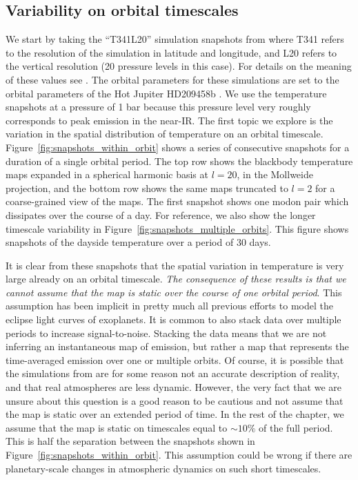 \documentclass[12pt,dvipsnames]{report}
\begin{document}
\subsection{Variability on orbital timescales}
We start by taking the ``T341L20'' simulation snapshots from \citet{2021ApJ...913L..32C} 
where T341 refers to the resolution of the simulation in latitude and longitude, and 
L20 refers to the vertical resolution (20 pressure levels in this case). 
For details on the meaning of these values see \citet{2021MNRAS.504.5172S}. 
The orbital parameters for these simulations are set to the orbital parameters of the
Hot Jupiter HD209458b  \citep{2000ApJ...529L..41H,2000ApJ...529L..45C}. 
We use the temperature snapshots at a pressure of 1 bar because this pressure level very roughly 
corresponds to peak emission in the near-IR.
The first topic we explore is the variation in the spatial distribution of 
temperature on an orbital timescale. Figure~\ref{fig:snapshots_within_orbit} shows a series 
of consecutive snapshots for a duration of a single orbital period.
The top row shows the blackbody temperature maps expanded in a spherical harmonic basis 
at $l=20$, in the Mollweide projection, and the bottom row shows the same maps truncated 
to $l=2$ for a coarse-grained view of the maps. The first snapshot shows one modon pair
which dissipates over the course of a day. For reference, we also show the longer timescale
variability in Figure~\ref{fig:snapshots_multiple_orbits}. This figure shows snapshots 
of the dayside temperature over a period of 30 days. 


It is clear from these snapshots that the spatial variation in temperature is very large 
already on an orbital timescale. \emph{The consequence of these results is that we 
cannot assume that the map is static over the course of one orbital period}. This assumption
has been implicit in pretty much all previous efforts to model the eclipse light curves
of exoplanets. It is common to also stack data over multiple periods to increase 
signal-to-noise. Stacking the data means that we are not inferring 
an instantaneous map of emission, but rather a map that represents the time-averaged emission over 
one or multiple orbits. Of course, it is possible that the simulations from 
\citet{2021ApJ...913L..32C} are for some reason not an accurate description of reality,
and that real atmospheres are less dynamic. However, the very fact that we are unsure 
about this question is a good reason to be cautious and not assume that the map is static over an 
extended period of time. In the rest of the chapter, we assume that the map is static on 
timescales equal to $\sim10\%$ of the full period. This is half the separation 
between the snapshots shown in Figure~\ref{fig:snapshots_within_orbit}. This 
assumption could be wrong if there are planetary-scale changes in atmospheric dynamics 
on such short timescales.
\end{document}
